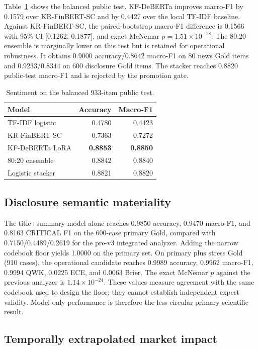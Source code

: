 \documentclass[11pt]{article}
\begin{document}
Table~\ref{tab:sentiment} shows the balanced public test. KF-DeBERTa improves macro-F1 by 0.1579 over KR-FinBERT-SC and by 0.4427 over the local TF-IDF baseline. Against KR-FinBERT-SC, the paired-bootstrap macro-F1 difference is 0.1566 with 95\% CI [0.1262, 0.1877], and exact McNemar $p=1.51\times10^{-18}$. The 80:20 ensemble is marginally lower on this test but is retained for operational robustness. It obtains 0.9000 accuracy/0.8642 macro-F1 on 80 news Gold items and 0.9233/0.8344 on 600 disclosure Gold items. The stacker reaches 0.8820 public-test macro-F1 and is rejected by the promotion gate.

\begin{table}[t]
\centering
\small
\begin{tabular}{lrr}
\toprule
Model & Accuracy & Macro-F1 \\
\midrule
TF-IDF logistic & 0.4780 & 0.4423 \\
KR-FinBERT-SC & 0.7363 & 0.7272 \\
KF-DeBERTa LoRA & \textbf{0.8853} & \textbf{0.8850} \\
80:20 ensemble & 0.8842 & 0.8840 \\
Logistic stacker & 0.8821 & 0.8820 \\
\bottomrule
\end{tabular}
\caption{Sentiment on the balanced 933-item public test.}
\label{tab:sentiment}
\end{table}

\subsection{Disclosure semantic materiality}

The title+summary model alone reaches 0.9850 accuracy, 0.9470 macro-F1, and 0.8163 CRITICAL F1 on the 600-case primary Gold, compared with 0.7150/0.4489/0.2619 for the pre-v3 integrated analyzer. Adding the narrow codebook floor yields 1.0000 on the primary set. On primary plus stress Gold (910 cases), the operational candidate reaches 0.9989 accuracy, 0.9962 macro-F1, 0.9994 QWK, 0.0225 ECE, and 0.0063 Brier. The exact McNemar $p$ against the previous analyzer is $1.14\times10^{-24}$. These values measure agreement with the same codebook used to design the floor; they cannot establish independent expert validity. Model-only performance is therefore the less circular primary scientific result.

\subsection{Temporally extrapolated market impact}
\end{document}
